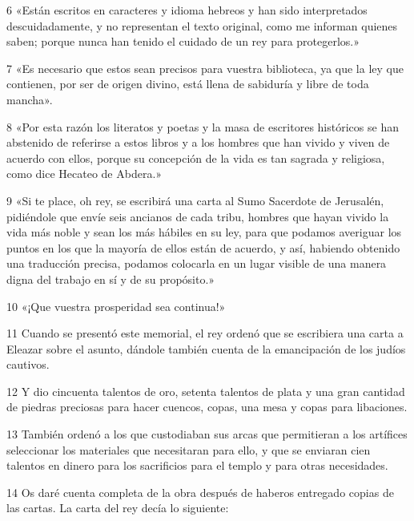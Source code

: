 \par 6 «Están escritos en caracteres y idioma hebreos y han sido interpretados descuidadamente, y no representan el texto original, como me informan quienes saben; porque nunca han tenido el cuidado de un rey para protegerlos.»

\par 7 «Es necesario que estos sean precisos para vuestra biblioteca, ya que la ley que contienen, por ser de origen divino, está llena de sabiduría y libre de toda mancha».

\par 8 «Por esta razón los literatos y poetas y la masa de escritores históricos se han abstenido de referirse a estos libros y a los hombres que han vivido y viven de acuerdo con ellos, porque su concepción de la vida es tan sagrada y religiosa, como dice Hecateo de Abdera.»

\par 9 «Si te place, oh rey, se escribirá una carta al Sumo Sacerdote de Jerusalén, pidiéndole que envíe seis ancianos de cada tribu, hombres que hayan vivido la vida más noble y sean los más hábiles en su ley, para que podamos averiguar los puntos en los que la mayoría de ellos están de acuerdo, y así, habiendo obtenido una traducción precisa, podamos colocarla en un lugar visible de una manera digna del trabajo en sí y de su propósito.»

\par 10 «¡Que vuestra prosperidad sea continua!»

\par 11 Cuando se presentó este memorial, el rey ordenó que se escribiera una carta a Eleazar sobre el asunto, dándole también cuenta de la emancipación de los judíos cautivos.

\par 12 Y dio cincuenta talentos de oro, setenta talentos de plata y una gran cantidad de piedras preciosas para hacer cuencos, copas, una mesa y copas para libaciones.

\par 13 También ordenó a los que custodiaban sus arcas que permitieran a los artífices seleccionar los materiales que necesitaran para ello, y que se enviaran cien talentos en dinero para los sacrificios para el templo y para otras necesidades.

\par 14 Os daré cuenta completa de la obra después de haberos entregado copias de las cartas. La carta del rey decía lo siguiente:

